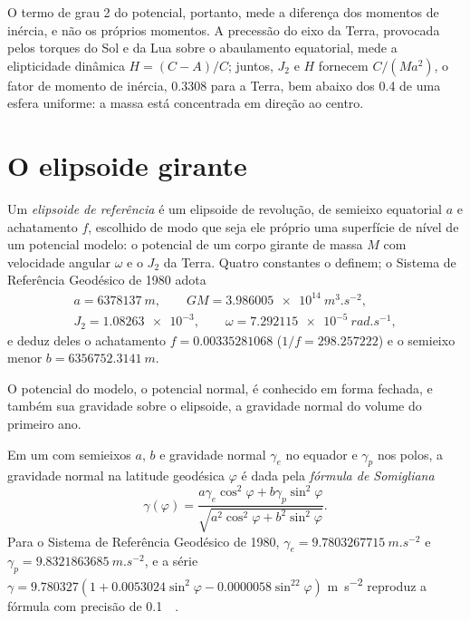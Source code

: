 O termo de grau 2 do potencial, portanto, mede a diferença dos
momentos de inércia, e não os próprios momentos. A precessão do eixo da Terra,
provocada pelos torques do Sol e da Lua sobre o abaulamento equatorial,
mede a elipticidade dinâmica $H = (C - A)/C$; juntos, $J_2$ e $H$ fornecem
$C/(Ma^2)$, o fator de momento de inércia, \num{0.3308} para a Terra,
bem abaixo dos \num{0.4} de uma esfera uniforme: a massa está concentrada em direção
ao centro.

\section{O elipsoide girante}

\begin{definition}\label{def:b3:gravity-geodesy:ellipsoid}
Um \emph{elipsoide de referência} é um elipsoide de
revolução, de semieixo equatorial $a$ e achatamento $f$, escolhido de modo que seja
ele próprio uma superfície de nível de um potencial modelo: o potencial de um corpo
girante de massa $M$ com velocidade angular $\omega$ e o 
$J_2$ da Terra. Quatro constantes o definem; o Sistema de Referência Geodésico de
1980 adota
\begin{gather*}
  a = \qty{6378137}{m},\qquad GM = \qty{3.986005e14}{m^3.s^{-2}},\\
  J_2 = \num{1.08263e-3},\qquad \omega = \qty{7.292115e-5}{rad.s^{-1}},
\end{gather*}
e deduz deles o achatamento $f = \num{0.00335281068}$
($1/f = \num{298.257222}$) e o semieixo menor
$b = \qty{6356752.3141}{m}$.
\end{definition}

O potencial do modelo, o potencial normal, é conhecido em forma fechada, e também
sua gravidade sobre o elipsoide, a gravidade normal do volume do primeiro ano.

\begin{proposition}\label{prop:b3:gravity-geodesy:somigliana}
Em um  com semieixos $a$, $b$ e gravidade normal
$\gamma_e$ no equador e $\gamma_p$ nos polos, a gravidade normal na latitude
geodésica $\varphi$ é dada pela \emph{fórmula de
Somigliana}
\[
  \gamma(\varphi) = \frac{a\gamma_e\cos^2\varphi + b\gamma_p\sin^2\varphi}
  {\sqrt{a^2\cos^2\varphi + b^2\sin^2\varphi}} .
\]
Para o Sistema de Referência Geodésico de 1980, $\gamma_e = \qty{9.7803267715}{m.s^{-2}}$
e $\gamma_p = \qty{9.8321863685}{m.s^{-2}}$, e a série
$\gamma = 9.780327(1 + 0.0053024\sin^2\varphi - 0.0000058\sin^22\varphi)$
\unit{m.s^{-2}} reproduz a fórmula com precisão de \qty{0.1}{\milli\gal}.
\end{proposition}
\admitted

